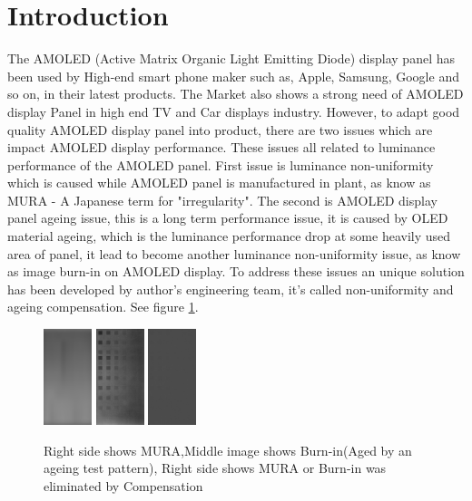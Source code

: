 \documentclass{article}
\begin{document}
\section{Introduction}
The AMOLED (Active Matrix Organic Light Emitting Diode) display panel has been used by High-end smart phone maker such as, Apple, Samsung, Google and so on, in their latest products. The Market also shows a strong need of AMOLED display Panel in high end TV and Car displays industry. However, to adapt good quality AMOLED display panel into product, there are two issues which are impact AMOLED display performance. These issues all related to luminance performance of the AMOLED panel. First issue is luminance non-uniformity which is caused while AMOLED panel is manufactured in plant, as know as MURA - A Japanese term for "irregularity". The second is AMOLED display panel ageing issue, this is a long term performance issue, it is caused by OLED material ageing, which is the luminance performance drop at some heavily used area of panel, it lead to become another luminance non-uniformity issue, as know as image burn-in on AMOLED display. 
To address these issues an unique solution has been developed by author's engineering team, it's called non-uniformity and ageing compensation. See figure \ref{fig1}. \\
\begin{figure}[h]
    \centering
    \includegraphics[width=0.125\textwidth]{images/csfed_G_480_I0_PsdLum.png}\hfill    
    \includegraphics[width=0.125\textwidth]{images/A1_G_300_I0_PsdLum.csv.png}\hfill
    \includegraphics[width=0.125\textwidth]{images/A1_G_300_I2_PsdLum.csv.png}\hfill
    \caption{Right side shows MURA,Middle image shows Burn-in(Aged by an ageing test pattern), Right side shows MURA or Burn-in was eliminated by  Compensation }
    \label{fig1}
\end{figure}
\end{document}
